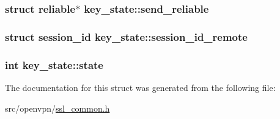 \subsubsection[{send\+\_\+reliable}]{\setlength{\rightskip}{0pt plus 5cm}struct {\bf reliable}$\ast$ key\+\_\+state\+::send\+\_\+reliable}\label{structkey__state_ad0f7af5a94d446e54c369daa1e958f91}
\hypertarget{structkey__state_aa2f4046c0cb3757c8cc20702dc4097ad}{}
\subsubsection[{session\+\_\+id\+\_\+remote}]{\setlength{\rightskip}{0pt plus 5cm}struct {\bf session\+\_\+id} key\+\_\+state\+::session\+\_\+id\+\_\+remote}\label{structkey__state_aa2f4046c0cb3757c8cc20702dc4097ad}
\hypertarget{structkey__state_a42be32cf0cb8d287f43befbbb6715472}{}
\subsubsection[{state}]{\setlength{\rightskip}{0pt plus 5cm}int key\+\_\+state\+::state}\label{structkey__state_a42be32cf0cb8d287f43befbbb6715472}


The documentation for this struct was generated from the following file\+:\begin{DoxyCompactItemize}
\item 
src/openvpn/\hyperlink{ssl__common_8h}{ssl\+\_\+common.\+h}\end{DoxyCompactItemize}
